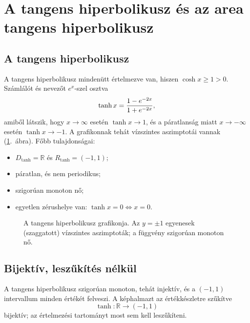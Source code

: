 \documentclass[11pt]{scrartcl}
\theoremstyle{definition}
\theoremstyle{remark}
\begin{document}
\section{A tangens hiperbolikusz és az area tangens hiperbolikusz}

\subsection{A tangens hiperbolikusz}

A tangens hiperbolikusz mindenütt értelmezve van, hiszen $\cosh x \ge 1 > 0$.
Számlálót és nevezőt $e^x$-szel osztva
\[
	\tanh x = \frac{1 - e^{-2x}}{1 + e^{-2x}}\text,
\]
amiből látszik, hogy $x \to \infty$ esetén $\tanh x \to 1$, és a páratlanság
miatt $x \to -\infty$ esetén $\tanh x \to -1$. A grafikonnak tehát vízszintes
aszimptotái vannak (\ref{fig:tanh}.~ábra). Főbb tulajdonságai:
\begin{itemize}
	\item $D_{\tanh} = \mathbb{R}$ és $R_{\tanh} = (-1, 1)$;
	\item páratlan, és nem periodikus;
	\item szigorúan monoton nő;
	\item egyetlen zérushelye van: $\tanh x = 0 \iff x = 0$.
\end{itemize}

\begin{figure}[ht]
	\centering
	\caption{A tangens hiperbolikusz grafikonja. Az $y = \pm 1$ egyenesek
		(szaggatott) vízszintes aszimptoták; a függvény szigorúan monoton nő.}
	\label{fig:tanh}
\end{figure}

\subsection{Bijektív, leszűkítés nélkül}

A tangens hiperbolikusz szigorúan monoton, tehát injektív, és a $(-1, 1)$
intervallum minden értékét felveszi. A képhalmazt az értékkészletre szűkítve
\[
	\tanh\colon \mathbb{R} \to (-1, 1)
\]
bijektív; az értelmezési tartományt most sem kell leszűkíteni.
\end{document}
